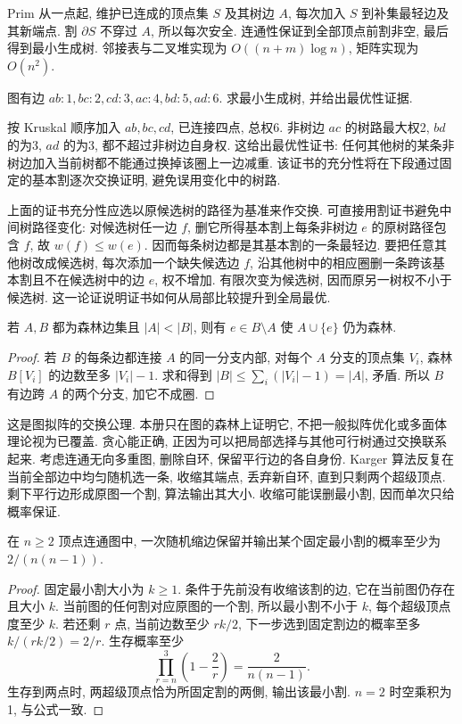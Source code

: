 Prim 从一点起, 维护已连成的顶点集 $S$ 及其树边 $A$, 每次加入 $S$ 到补集最轻边及其新端点. 割 $\partial S$ 不穿过 $A$, 所以每次安全. 连通性保证到全部顶点前割非空, 最后得到最小生成树. 邻接表与二叉堆实现为 $O((n+m)\log n)$, 矩阵实现为 $O(n^2)$.
\begin{example}
图有边 $ab:1,bc:2,cd:3,ac:4,bd:5,ad:6$. 求最小生成树, 并给出最优性证据.
\end{example}
\begin{solution}
按 Kruskal 顺序加入 $ab,bc,cd$, 已连接四点, 总权6. 非树边 $ac$ 的树路最大权2, $bd$ 的为3, $ad$ 的为3, 都不超过非树边自身权. 这给出最优性证书: 任何其他树的某条非树边加入当前树都不能通过换掉该圈上一边减重. 该证书的充分性将在下段通过固定的基本割逐次交换证明, 避免误用变化中的树路.
\end{solution}
上面的证书充分性应选以原候选树的路径为基准来作交换. 可直接用割证书避免中间树路径变化: 对候选树任一边 $f$, 删它所得基本割上每条非树边 $e$ 的原树路径包含 $f$, 故 $w(f)\le w(e)$. 因而每条树边都是其基本割的一条最轻边. 要把任意其他树改成候选树, 每次添加一个缺失候选边 $f$, 沿其他树中的相应圈删一条跨该基本割且不在候选树中的边 $e$, 权不增加. 有限次变为候选树, 因而原另一树权不小于候选树. 这一论证说明证书如何从局部比较提升到全局最优.
\begin{proposition}\label{prop:forestexchange}
若 $A,B$ 都为森林边集且 $|A|<|B|$, 则有 $e\in B\setminus A$ 使 $A\cup\{e\}$ 仍为森林.
\end{proposition}
\begin{proof}
若 $B$ 的每条边都连接 $A$ 的同一分支内部, 对每个 $A$ 分支的顶点集 $V_i$, 森林 $B[V_i]$ 的边数至多 $|V_i|-1$. 求和得到 $|B|\le\sum_i(|V_i|-1)=|A|$, 矛盾. 所以 $B$ 有边跨 $A$ 的两个分支, 加它不成圈.
\end{proof}
这是图拟阵的交换公理. 本册只在图的森林上证明它, 不把一般拟阵优化或多面体理论视为已覆盖. 贪心能正确, 正因为可以把局部选择与其他可行树通过交换联系起来.
考虑连通无向多重图, 删除自环, 保留平行边的各自身份. Karger 算法反复在当前全部边中均匀随机选一条, 收缩其端点, 丢弃新自环, 直到只剩两个超级顶点. 剩下平行边形成原图一个割, 算法输出其大小. 收缩可能误删最小割, 因而单次只给概率保证.
\begin{theorem}\label{thm:karger}
在 $n\ge2$ 顶点连通图中, 一次随机缩边保留并输出某个固定最小割的概率至少为 $2/(n(n-1))$.
\end{theorem}
\begin{proof}
固定最小割大小为 $k\ge1$. 条件于先前没有收缩该割的边, 它在当前图仍存在且大小 $k$. 当前图的任何割对应原图的一个割, 所以最小割不小于 $k$, 每个超级顶点度至少 $k$. 若还剩 $r$ 点, 当前边数至少 $rk/2$, 下一步选到固定割边的概率至多 $k/(rk/2)=2/r$. 生存概率至少
\[
\prod_{r=n}^{3}\left(1-\frac2r\right)=\frac2{n(n-1)}.
\]
生存到两点时, 两超级顶点恰为所固定割的两側, 输出该最小割. $n=2$ 时空乘积为1, 与公式一致.
\end{proof}
